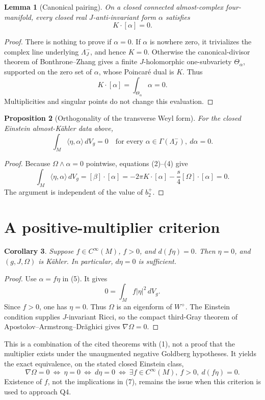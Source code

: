 \documentclass[11pt]{article}
\newtheorem{proposition}{Proposition}[section]
\newtheorem{corollary}[proposition]{Corollary}
\newtheorem{lemma}[proposition]{Lemma}
\theoremstyle{remark}
\newcommand{\Om}{\Omega}
\newcommand{\dd}{\,dV_g}
\begin{document}
\begin{lemma}[Canonical pairing]
On a closed connected almost-complex four-manifold,
every closed real \(J\)-anti-invariant form \(\alpha\) satisfies
\[
 K\cdot[\alpha]=0.
 \tag{4}
\]
\end{lemma}
\begin{proof}
There is nothing to prove if \(\alpha=0\).
If \(\alpha\) is nowhere zero, it trivializes the complex line underlying
\(\Lambda_J^-\), and hence \(K=0\).
Otherwise the canonical-divisor theorem of Bonthrone--Zhang
\cite[Theorem 1.1]{BZ} gives a finite \(J\)-holomorphic
one-subvariety \(\Theta_\alpha\), supported on the zero set of \(\alpha\),
whose Poincar\'e dual is \(K\). Thus
\[
 K\cdot[\alpha]=\int_{\Theta_\alpha}\alpha=0.
\]
Multiplicities and singular points do not change this evaluation.
\end{proof}

\begin{proposition}[Orthogonality of the transverse Weyl form]
For the closed Einstein almost-K\"ahler data above,
\[
 \boxed{\int_M\langle\eta,\alpha\rangle\dd=0
 \quad\text{for every }\alpha\in\Gamma(\Lambda_J^-),\ d\alpha=0.}
 \tag{5}
\]
\end{proposition}
\begin{proof}
Because \(\Om\wedge\alpha=0\) pointwise, equations (2)--(4) give
\[
 \int_M\langle\eta,\alpha\rangle\dd
 =[\beta]\cdot[\alpha]
 =-2\pi K\cdot[\alpha]-\frac{s}{4}[\Om]\cdot[\alpha]=0.
\]
The argument is independent of the value of \(b_2^+\).
\end{proof}

\section{A positive-multiplier criterion}
\begin{corollary}
Suppose \(f\in C^\infty(M)\), \(f>0\), and \(d(f\eta)=0\).
Then \(\eta=0\), and \((g,J,\Om)\) is K\"ahler.
In particular, \(d\eta=0\) is sufficient.
\end{corollary}
\begin{proof}
Use \(\alpha=f\eta\) in (5). It gives
\[
 0=\int_M f|\eta|^2\dd.
 \tag{6}
\]
Since \(f>0\), one has \(\eta=0\).
Thus \(\Om\) is an eigenform of \(W^+\).
The Einstein condition supplies \(J\)-invariant Ricci, so the compact
third-Gray theorem of Apostolov--Armstrong--Dr\u aghici
\cite[Theorem 2]{AAD} gives \(\nabla\Om=0\).
\end{proof}

This is a combination of the cited theorems with (1), not a proof that
the multiplier exists under the unaugmented negative Goldberg hypotheses.
It yields the exact equivalence, on the stated closed Einstein class,
\[
 \nabla\Om=0
 \ \Longleftrightarrow\ \eta=0
 \ \Longleftrightarrow\ d\eta=0
 \ \Longleftrightarrow\
 \exists f\in C^\infty(M),\ f>0,\ d(f\eta)=0.
 \tag{7}
\]
Existence of \(f\), not the implications in (7), remains the issue
when this criterion is used to approach Q4.
\end{document}
